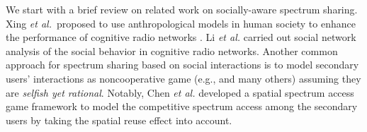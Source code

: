 We start with a brief review on related work on socially-aware spectrum sharing. Xing \emph{et al.}~proposed to use anthropological models in human society to enhance the performance of cognitive radio networks \cite{xing2008human}. Li \emph{et al.} \cite{li2011propagation} carried out social network analysis of the social behavior in cognitive radio networks. Another common approach for spectrum sharing based on social interactions is to model secondary users' interactions as noncooperative game (e.g., \cite{wang2010game} and many others) assuming they are \emph{selfish yet rational}. Notably, 
Chen \emph{et al.} \cite{chen2012spatial} developed a spatial spectrum access game framework to model the competitive spectrum access among the secondary users by taking the spatial reuse effect into account. 



